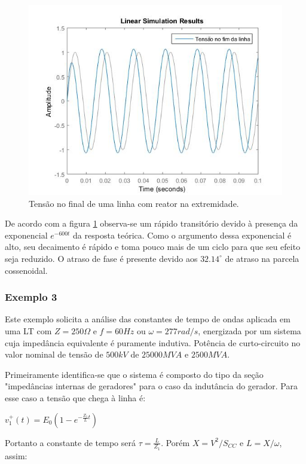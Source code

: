 \begin{figure}[H]
\begin{center}
\includegraphics[width=12cm]{images/sim1.jpg}
\caption{Tensão no final de uma linha com reator na extremidade.}
\label{sim:1} 
\end{center}
\end{figure}

De acordo com a figura \ref{sim:1} observa-se um rápido transitório devido à presença da exponencial $e^{-600t}$ da resposta teórica. Como o argumento dessa exponencial é alto, seu decaimento é rápido e toma pouco mais de um ciclo para que seu efeito seja reduzido. O atraso de fase é presente devido aos $32.14^{\circ}$ de atraso na parcela cossenoidal.
\subsubsection*{Exemplo 3}

Este exemplo solicita a análise das constantes de tempo de ondas aplicada em uma LT com $Z=250\Omega$ e $f=60Hz$ ou $\omega = 277 rad/s$, energizada por um sistema cuja impedância equivalente é puramente indutiva. Potência de curto-circuito no valor nominal de tensão de $500kV$ de $25000MVA$ e $2500MVA$. 

Primeiramente identifica-se que o sistema é composto do tipo da seção "impedâncias internas de geradores" para o caso da indutância do gerador. Para esse caso a tensão que chega à linha é:


\begin{center}
    $v_1^{+}(t) = E_0(1-e^{-\frac{Z_1}{L}t})$
\end{center}

Portanto a constante de tempo será $\tau=\frac{L}{Z_1}$. Porém $X=V^2/S_{CC}$ e $L = X/\omega$, assim:

